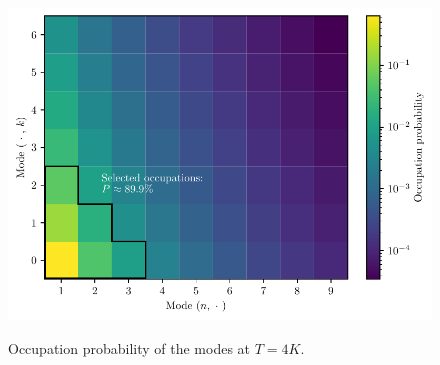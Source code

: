 \begin{figure}[!htbp]
  \centering
  \includegraphics[width=\textwidth]{./../figures/vibrations/vibrations-mode-occupation.pdf}
  \label{fig:4:occupation-probability}
  \caption{Occupation probability of the modes at $T=4\si{K}$.}
\end{figure}